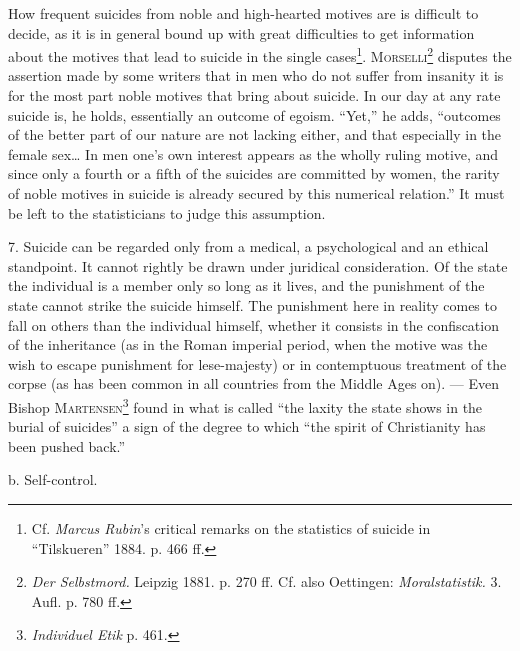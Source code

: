 \documentclass[12pt,a4paper,openany]{book}
\newcommand{\opage}[1]{\marginnote{\footnotesize\textit{[#1]}}}
\begin{document}
How frequent suicides from noble and high-hearted motives are is difficult to decide, as it is in general bound up
with great difficulties to get information about the motives that lead to suicide in the single
cases\footnote[1]{Cf. \emph{Marcus Rubin}'s critical remarks on the statistics of suicide in ``Tilskueren''
1884. p. 466 ff.}. \textsc{Morselli}\footnote[2]{\textit{Der Selbstmord.} Leipzig 1881. p. 270 ff. Cf. also
Oettingen: \textit{Moralstatistik.} 3. Aufl. p. 780 ff.} disputes the assertion made by some writers that in men
who do not suffer from insanity it is for the most part noble motives that bring about suicide. In our day at any
rate suicide is, he holds, essentially an outcome of egoism. ``Yet,'' he adds, ``outcomes of the better part of our
nature are not lacking either, and that especially in the female sex\dots{} In men one's own interest appears as
the wholly ruling motive, and since only a fourth or a fifth of the suicides are committed by women, the rarity of
noble motives in suicide is already secured by this numerical relation.'' It must be left to the statisticians to
judge this assumption.

7. Suicide can be regarded only from a medical, a psychological and an ethical standpoint. It cannot rightly be
drawn under juridical consideration. Of the state the individual is a member only so long as it lives, and the
punishment of the state cannot strike the suicide himself. The punishment here in reality comes to fall on others
than the individual himself, whether it consists in the confiscation of the inheritance (as in the Roman imperial
period, when the motive was the wish to escape punishment for lese-majesty) or in contemptuous treatment of the
corpse (as has been common in all countries from the Middle Ages on). --- Even
\opage{220}Bishop \textsc{Martensen}\footnote[1]{\textit{Individuel Etik} p. 461.} found in what is called ``the
laxity the state shows in the burial of suicides'' a sign of the degree to which ``the spirit of Christianity has
been pushed back.''

\begin{center}b. Self-control.\end{center}
\end{document}
